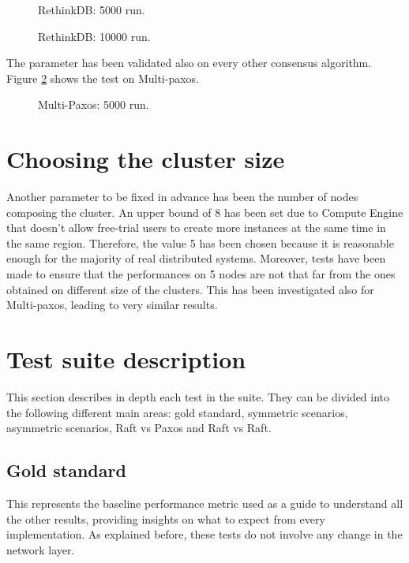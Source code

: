 \begin{figure}[H]
  \caption{RethinkDB: 5000 run.}
  \label{rethinkdb_stable}
\end{figure}

\begin{figure}[H]
  \caption{RethinkDB: 10000 run.}
\end{figure}

The parameter has been validated also on every other consensus algorithm. Figure \ref{paxos5000} shows the test on Multi-paxos.

\begin{figure}[H]
  \caption{Multi-Paxos: 5000 run.}
  \label{paxos5000}
\end{figure}

\section{Choosing the cluster size}
Another parameter to be fixed in advance has been the number of nodes composing the cluster. An upper bound of 8 has been set due to Compute Engine that doesn’t allow free-trial users to create more instances at the same time in the same region. Therefore, the value 5 has been chosen because it is reasonable enough for the majority of real distributed systems. Moreover, tests have been made to ensure that the performances on 5 nodes are not that far from the ones obtained on different size of the clusters. This has been investigated also for Multi-paxos, leading to very similar results. 

\section{Test suite description}
This section describes in depth each test in the suite. They can be divided into the following different main areas: gold standard, symmetric scenarios, asymmetric scenarios, Raft vs Paxos and Raft vs Raft.

\subsection{Gold standard}
This represents the baseline performance metric used as a guide to understand all the other results, providing insights on what to expect from every implementation. As explained before, these tests do not involve any change in the network layer.

